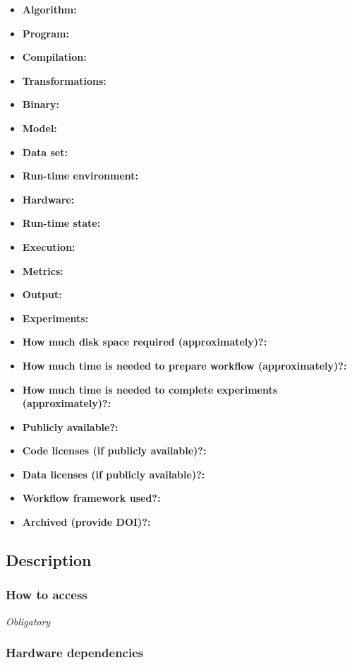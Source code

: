 \documentclass{sigplanconf}
\begin{document}
{\small
\begin{itemize}
  \item {\bf Algorithm: }
  \item {\bf Program: }
  \item {\bf Compilation: }
  \item {\bf Transformations: }
  \item {\bf Binary: }
  \item {\bf Model: }
  \item {\bf Data set: }
  \item {\bf Run-time environment: }
  \item {\bf Hardware: }
  \item {\bf Run-time state: }
  \item {\bf Execution: }
  \item {\bf Metrics: }
  \item {\bf Output: }
  \item {\bf Experiments: }
  \item {\bf How much disk space required (approximately)?: }
  \item {\bf How much time is needed to prepare workflow (approximately)?: }
  \item {\bf How much time is needed to complete experiments (approximately)?: }
  \item {\bf Publicly available?: }
  \item {\bf Code licenses (if publicly available)?: }
  \item {\bf Data licenses (if publicly available)?: }
  \item {\bf Workflow framework used?: }
  \item {\bf Archived (provide DOI)?: }
\end{itemize}

\subsection{Description}

\subsubsection{How to access}

{\em Obligatory}

\subsubsection{Hardware dependencies}

}
\end{document}
